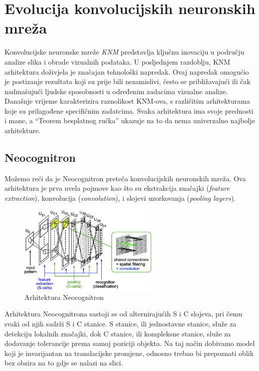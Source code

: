 
\chapter{Evolucija konvolucijskih neuronskih mreža}\label{ch:evolucija-konvolucijskih-neuronskih-mreza}
Konvolucijske neuronske mreže \emph{KNM} predstavlja ključnu inovaciju u području analize slika i obrade vizualnih podataka.
U posljednjem razdoblju, KNM arhitektura doživjela je značajan tehnološki napredak.
Ovaj napredak omogućio je postizanje rezultata koji su prije bili nezamislivi, često se približavajući ili čak nadmašujući ljudske sposobnosti u određenim zadacima vizualne analize.
Današnje vrijeme karakterizira raznolikost KNM-ova, s različitim arhitekturama koje su prilagođene specifičnim zadatcima.
Svaka arhitektura ima svoje prednosti i mane, a \enquote{Teorem besplatnog ručka} ukazuje na to da nema univerzalno najbolje arhitekture.

\section{Neocognitron}\label{sec:neocognitron}
Možemo reći da je Neocognitron preteča konvolucijskih neuronskih mreža.
Ova arhitektura je prva uvela pojmove kao što su ekstrakcija značajki (\emph{feature extraction}), konvolucija (\emph{convolution}), i slojevi uzorkovanja (\emph{pooling layers}).
\FloatBarrier
\begin{figure}[h]
    \centering
    \includegraphics[width=0.6\textwidth]{images/Neocognitron}
    \caption{Arhitektura Neocognitron
    \protect\footnotemark}
    \label{fig:slika7}
\end{figure}
\FloatBarrier
{}
Arhitektura Neocognitrona sastoji se od alternirajućih S i C slojeva, pri čemu svaki od njih sadrži S i C stanice.
S stanice, ili jednostavne stanice, služe za detekciju lokalnih značajki, dok C stanice, ili kompleksne stanice, služe za dodavanje tolerancije prema samoj poziciji objekta.
Na taj način dobivamo model koji je invarijantan na translacijske promjene, odnosno trebao bi prepoznati oblik bez obzira na to gdje se nalazi na slici.

